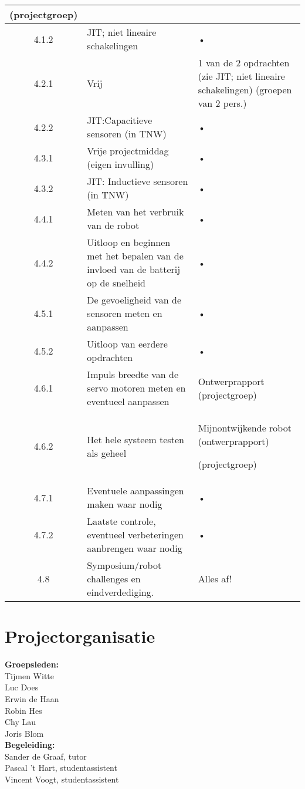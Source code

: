\documentclass[11pt]{article}
\begin{document}
\begin{adjustbox}{width=\textwidth,totalheight=\textheight,keepaspectratio}
\begin{tabular}{|c|p{10cm}|p{8cm}|}
(projectgroep)
 \\
\hline
4.1.2 & JIT; niet lineaire schakelingen & • \\
\hline
4.2.1 & Vrij & 1 van de 2 opdrachten (zie JIT; niet lineaire schakelingen)
(groepen van 2 pers.)
 \\
\hline
4.2.2 & JIT:Capacitieve sensoren (in TNW) & • \\
\hline
4.3.1 & Vrije projectmiddag (eigen invulling) & • \\
\hline
4.3.2 & JIT: Inductieve sensoren (in TNW) & • \\
\hline
4.4.1 & Meten van het verbruik van de robot & • \\
\hline
4.4.2 & Uitloop en beginnen met het bepalen van de invloed van de batterij op de snelheid & • \\
\hline
4.5.1 & De gevoeligheid van de sensoren meten en aanpassen  & • \\
\hline
4.5.2 & Uitloop van eerdere opdrachten & • \\
\hline
4.6.1 & Impuls breedte van de servo motoren meten en eventueel aanpassen & Ontwerprapport (projectgroep)
 \\
\hline
4.6.2 & Het hele systeem testen als geheel & Mijnontwijkende robot (ontwerprapport) 

(projectgroep)
\\
\hline
4.7.1 & Eventuele aanpassingen maken waar nodig & • \\
\hline
4.7.2 & Laatste controle, eventueel verbeteringen aanbrengen waar nodig & • \\
\hline
4.8 & Symposium/robot challenges en eindverdediging. & Alles af! \\
\hline
\end{tabular}

\end{adjustbox}
 

\newpage
\section{Projectorganisatie}
\textbf{Groepsleden:}\\ 
Tijmen Witte\\ 
Luc Does\\ 
Erwin de Haan\\ 
Robin Hes\\ 
Chy Lau\\ 
Joris Blom\\

\noindent \textbf{Begeleiding:}\\
Sander de Graaf, tutor\\
Pascal 't Hart, studentassistent\\
Vincent Voogt, studentassistent\\
\end{document}

